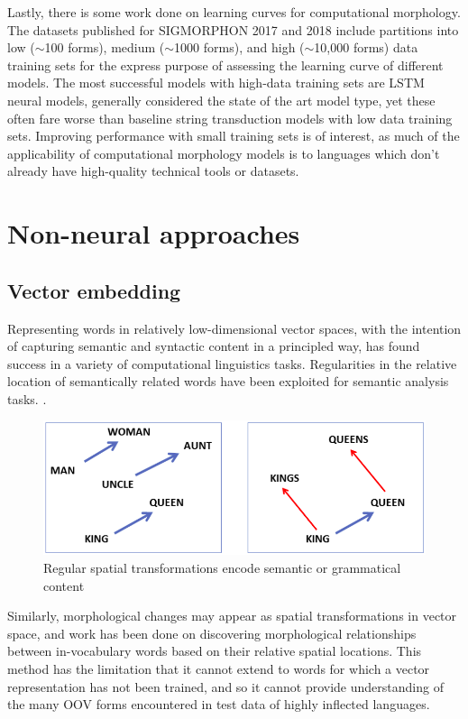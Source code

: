 Lastly, there is some work done on learning curves for computational morphology. The datasets published for SIGMORPHON 2017 and 2018 include partitions into low ($\sim$100 forms), medium ($\sim$1000 forms), and high ($\sim$10,000 forms) data training sets for the express purpose of assessing the learning curve of different models. The most successful models with high-data training sets are LSTM neural models, generally considered the state of the art model type, yet these often fare worse than baseline string transduction models with low data training sets. \parencite{Cotterell2017} \parencite{Cotterell2018b} Improving performance with small training sets is of interest, as much of the applicability of computational morphology models is to languages which don't already have high-quality technical tools or datasets. 

\newpage

\section{Non-neural approaches}

\subsection{Vector embedding}

Representing words in relatively low-dimensional vector spaces, with the intention of capturing semantic and syntactic content in a principled way, has found success in a variety of computational linguistics tasks. Regularities in the relative location of semantically related words have been exploited for semantic analysis tasks. \parencite{Bilmes2003} \parencite{Alexandrescu2006}.

\begin{figure}[t]
\includegraphics[width=12cm]{images/semantic_transform.png}
\centering
\caption{Regular spatial transformations encode semantic or grammatical content \parencite{Mikolov2013}}
\end{figure}

Similarly, morphological changes may appear as spatial transformations in vector space, and work has been done on discovering morphological relationships between in-vocabulary words based on their relative spatial locations. This method has the limitation that it cannot extend to words for which a vector representation has not been trained, and so it cannot provide understanding of the many OOV forms encountered in test data of highly inflected languages. \parencite{Mikolov2013} \parencite{Soricut2015} \parencite{DosSantos2014} \parencite{Cotterell2019} 

